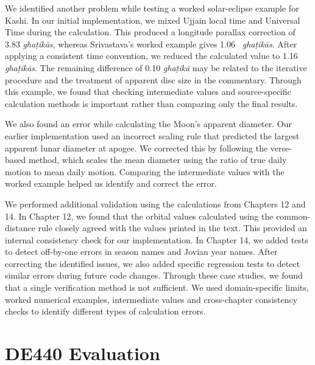 \documentclass[12pt,a4paper,oneside]{report}
\begin{document}
We identified another problem while testing a worked solar-eclipse example for Kashi. In our initial implementation, we mixed Ujjain local time and Universal Time during the calculation. This produced a longitude parallax correction of 3.83 \emph{ghaṭikās}, whereas Srivastava's worked example gives 1.06~\cite{shrivastava} \emph{ghaṭikās}. After applying a consistent time convention, we reduced the calculated value to 1.16 \emph{ghaṭikās}. The remaining difference of 0.10 \emph{ghaṭikā} may be related to the iterative procedure and the treatment of apparent disc size in the commentary. Through this example, we found that checking intermediate values and source-specific calculation methods is important rather than comparing only the final results.

We also found an error while calculating the Moon's apparent diameter. Our earlier implementation used an incorrect scaling rule that predicted the largest apparent lunar diameter at apogee. We corrected this by following the verse-based method, which scales the mean diameter using the ratio of true daily motion to mean daily motion. Comparing the intermediate values with the worked example helped us identify and correct the error.

We performed additional validation using the calculations from Chapters 12 and 14. In Chapter 12, we found that the orbital values calculated using the common-distance rule closely agreed with the values printed in the text. This provided an internal consistency check for our implementation. In Chapter 14, we added tests to detect off-by-one errors in season names and Jovian year names. After correcting the identified issues, we also added specific regression tests to detect similar errors during future code changes. Through these case studies, we found that a single verification method is not sufficient. We used domain-specific limits, worked numerical examples, intermediate values and cross-chapter consistency checks to identify different types of calculation errors.

\section{DE440 Evaluation}
\label{sec:de440}
\end{document}
